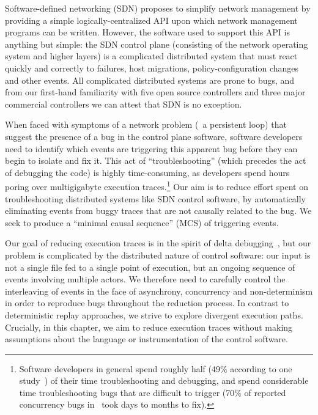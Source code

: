 Software-defined networking (SDN) proposes to simplify network management by
providing a simple logically-centralized API upon which network management
programs can be written. However, the software used to support this API is
anything but simple: the SDN control plane (consisting of the network
operating system and higher layers) is a complicated distributed system that
must react quickly and correctly to failures, host migrations,
policy-configuration changes and other events.
All complicated distributed systems are prone to bugs, and from our first-hand
familiarity with five open source controllers and three major commercial
controllers we can attest that SDN is no exception.

When faced with symptoms of a network problem (\eg~a persistent loop)
that suggest the presence of a bug in the control plane software,
software developers need to identify which events are triggering
this apparent bug before they can begin to isolate and fix it.
This act of ``troubleshooting'' (which precedes the act of debugging the
code) is highly time-consuming, as developers spend hours poring
over multigigabyte execution traces.\footnote{Software developers in general spend roughly half (49\% according to one
study~\cite{msoft_concurrency}) of their time troubleshooting and debugging, and spend
considerable time troubleshooting bugs that are difficult to trigger (70\% of reported concurrency bugs
in~\cite{msoft_concurrency} took days to months to fix).}
Our aim is to reduce effort spent on troubleshooting distributed systems like
SDN control software, by automatically eliminating
events from buggy traces that are not causally related to the bug. We seek to
produce a ``minimal
causal sequence'' (MCS) of triggering events.

Our goal of reducing execution traces is in the spirit of
delta debugging~\cite{Zeller:1999:YMP:318773.318946}, but our problem is
complicated by the distributed nature of control software:
our input is not a single file fed to a single point of execution, but an ongoing
sequence of events involving
multiple actors. We therefore need to carefully
control the interleaving of events in the face of asynchrony, concurrency and non-determinism in
order to reproduce bugs throughout the reduction process.
In contrast to deterministic replay
approaches, we strive to explore divergent execution paths. Crucially, in this
chapter, we aim to
reduce execution traces without making assumptions about the language
or instrumentation of the control software.

